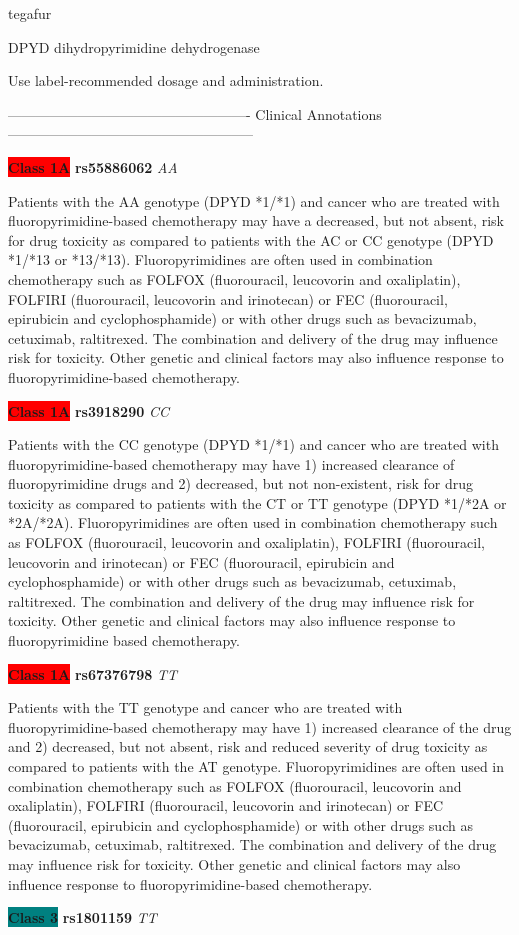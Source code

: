 \documentclass{resume} %
\begin{document}
\begin{rSection}{ tegafur }
\begin{rSubsection}{ DPYD }{ dihydropyrimidine dehydrogenase }{}{}
\item[] Use label-recommended dosage and administration.
\item[] ---------------------------------------------------- Clinical Annotations -----------------------------------------------------\newline
\item \textbf{\colorbox{red} {Class 1A}} \textbf{ rs55886062 } \textit{ AA }
\item[] Patients with the AA genotype (DPYD *1/*1) and cancer who are treated with fluoropyrimidine-based chemotherapy may have a decreased, but not absent, risk for drug toxicity as compared to patients with the AC or CC genotype (DPYD *1/*13 or *13/*13). Fluoropyrimidines are often used in combination chemotherapy such as FOLFOX (fluorouracil, leucovorin and oxaliplatin), FOLFIRI (fluorouracil, leucovorin and irinotecan) or FEC (fluorouracil, epirubicin and cyclophosphamide) or with other drugs such as bevacizumab, cetuximab, raltitrexed. The combination and delivery of the drug may influence risk for toxicity. Other genetic and clinical factors may also influence response to fluoropyrimidine-based chemotherapy.\item \textbf{\colorbox{red} {Class 1A}} \textbf{ rs3918290 } \textit{ CC }
\item[] Patients with the CC genotype (DPYD *1/*1) and cancer who are treated with fluoropyrimidine-based chemotherapy may have 1) increased clearance of fluoropyrimidine drugs and 2) decreased, but not non-existent, risk for drug toxicity as compared to patients with the CT or TT genotype (DPYD *1/*2A or *2A/*2A). Fluoropyrimidines are often used in combination chemotherapy such as FOLFOX (fluorouracil, leucovorin and oxaliplatin), FOLFIRI (fluorouracil,  leucovorin and irinotecan) or FEC (fluorouracil, epirubicin and cyclophosphamide) or with other drugs such as bevacizumab, cetuximab, raltitrexed. The combination and delivery of the drug may influence risk for toxicity. Other genetic and clinical factors may also influence response to fluoropyrimidine based chemotherapy.\item \textbf{\colorbox{red} {Class 1A}} \textbf{ rs67376798 } \textit{ TT }
\item[] Patients with the TT genotype and cancer who are treated with fluoropyrimidine-based chemotherapy may have 1) increased clearance of the drug and 2) decreased, but not absent, risk and reduced severity of drug toxicity as compared to patients with the AT genotype. Fluoropyrimidines are often used in combination chemotherapy such as FOLFOX (fluorouracil, leucovorin and oxaliplatin), FOLFIRI (fluorouracil, leucovorin and irinotecan) or FEC (fluorouracil, epirubicin and cyclophosphamide) or with other drugs such as bevacizumab, cetuximab, raltitrexed. The combination and delivery of the drug may influence risk for toxicity. Other genetic and clinical factors may also influence response to fluoropyrimidine-based chemotherapy.\item \textbf{\colorbox{teal} {Class 3}} \textbf{ rs1801159 } \textit{ TT }

\end{rSubsection}
\end{rSection}
\end{document}
